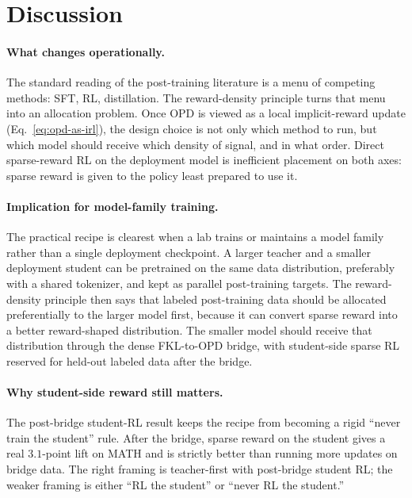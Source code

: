 \documentclass{article}
\begin{document}
\section{Discussion}
\label{sec:discussion}

\paragraph{What changes operationally.} The standard reading of the post-training literature is a menu of competing methods: SFT, RL, distillation. The reward-density principle turns that menu into an allocation problem. Once OPD is viewed as a local implicit-reward update (Eq.~\ref{eq:opd-as-irl}), the design choice is not only which method to run, but which model should receive which density of signal, and in what order. Direct sparse-reward RL on the deployment model is inefficient placement on both axes: sparse reward is given to the policy least prepared to use it.

\paragraph{Implication for model-family training.} The practical recipe is clearest when a lab trains or maintains a model family rather than a single deployment checkpoint. A larger teacher and a smaller deployment student can be pretrained on the same data distribution, preferably with a shared tokenizer, and kept as parallel post-training targets. The reward-density principle then says that labeled post-training data should be allocated preferentially to the larger model first, because it can convert sparse reward into a better reward-shaped distribution. The smaller model should receive that distribution through the dense FKL-to-OPD bridge, with student-side sparse RL reserved for held-out labeled data after the bridge.

\paragraph{Why student-side reward still matters.} The post-bridge student-RL result keeps the recipe from becoming a rigid ``never train the student'' rule. After the bridge, sparse reward on the student gives a real $3.1$-point lift on MATH and is strictly better than running more updates on bridge data. The right framing is teacher-first with post-bridge student RL; the weaker framing is either ``RL the student'' or ``never RL the student.''
\end{document}
